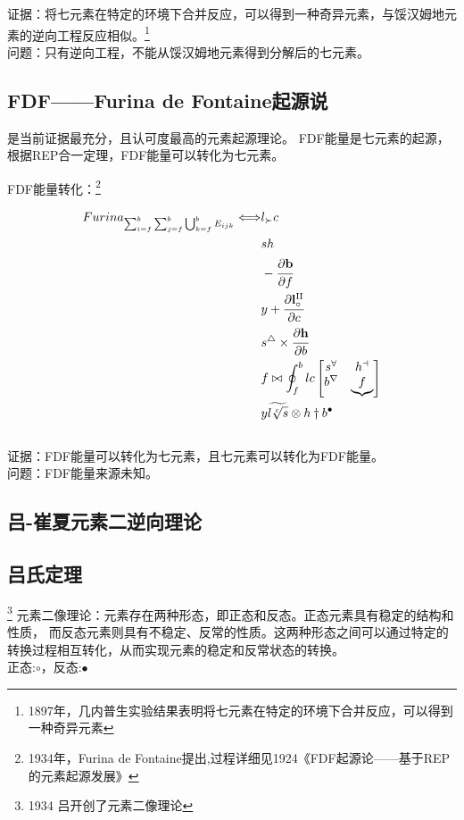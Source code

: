 \documentclass[12pt,a4paper]{article}%
\begin{document}
证据：将七元素在特定的环境下合并反应，可以得到一种奇异元素，与馁汉姆地元素的逆向工程反应相似。\footnote[15]{1897年，几内普生实验结果表明将七元素在特定的环境下合并反应，可以得到一种奇异元素}\\
问题：只有逆向工程，不能从馁汉姆地元素得到分解后的七元素。

\subsection{FDF——Furina de Fontaine起源说}

是当前证据最充分，且认可度最高的元素起源理论。
FDF能量是七元素的起源，根据REP合一定理，FDF能量可以转化为七元素。

FDF能量转化：\footnote[16]{1934年，Furina de Fontaine提出,过程详细见1924《FDF起源论——基于REP的元素起源发展》}

\begin{align}  
Furina_{\sum_{i=f}^{b} \sum_{j=f}^{b}\bigcup_{k=f}^b{E_{ijk}} }\Longleftrightarrow 
&l_{\succ } c\\ 
 &sh \\  
 &-\cfrac{\partial \mathbf{b}}{\partial f }  \\  
 &y +  \cfrac{\partial \mathbf{l_{\circ }^{\amalg } }}{\partial c}  \\ 
&s^{\bigtriangleup }  \times \cfrac{\partial \mathbf{h}}{\partial b} \\
&f\bowtie  \oint_{f}^{b}lc\begin{bmatrix}
 	s^{\forall } & h^{\dashv } \\
  b^{\nabla } &\underbrace{f} 
\end{bmatrix}  \\
&y\widetilde{l\sqrt[c]{s} } \otimes h\dagger b^{\bullet } 
\end{align} 
\\
证据：FDF能量可以转化为七元素，且七元素可以转化为FDF能量。\\
问题：FDF能量来源未知。
\begin{center}
\section{吕-崔夏元素二逆向理论}
\end{center}

\subsection{吕氏定理}\footnote[17]{1934 吕开创了元素二像理论}
元素二像理论：元素存在两种形态，即正态和反态。正态元素具有稳定的结构和性质，
而反态元素则具有不稳定、反常的性质。这两种形态之间可以通过特定的转换过程相互转化，从而实现元素的稳定和反常状态的转换。
\\
正态:$\circ$，反态:$\bullet $
\end{document}
